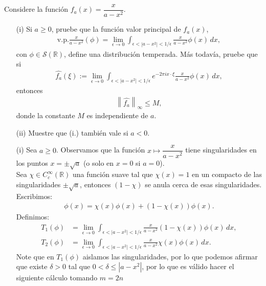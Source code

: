 \begin{homeworkProblem}
  Considere la función $f_a(x) = \dfrac{x}{a - x^2}$.
  \begin{itemize}
    \item[(i)] Si $a \geq 0$, pruebe que la función valor principal de $f_a(x)$,
    \begin{align*}
      \text{v.p.} \frac{x}{a - x^2} (\phi)= \lim_{\epsilon \to 0} \int_{\epsilon < |a - x^2| < 1/\epsilon} \frac{x}{a - x^2} \phi(x) \, dx,
    \end{align*}
    con $\phi \in \mathcal{S}(\mathbb{R})$, define una distribución temperada. Más todavía, pruebe que si
    \begin{align*}
      \hat{f_a}(\xi) := \lim_{\epsilon \to 0} \int_{\epsilon < |a - x^2| < 1/\epsilon} e^{-2\pi i x \cdot \xi} \frac{x}{a - x^2} \phi(x) \, dx,
    \end{align*}
    entonces
    \begin{align*}
      \left\| \hat{f_a} \right\|_{\infty} \leq M,
    \end{align*}
    donde la constante $M$ es independiente de $a$.  
    \item[(ii)] Muestre que (i.) también vale si $a < 0$.
  \end{itemize}
  \begin{solution}
    \begin{itemize}
      \item[(i)] Sea $a \geq 0$. Observamos que la funci\'on $x \mapsto \dfrac{x}{a - x^2}$ tiene singularidades en los puntos $x = \pm \sqrt{a}$ (o solo en $x=0$ si $a=0$).\\
       Sea $\chi \in C_c^{\infty}(\mathbb{R})$ una función suave tal que $\chi(x) = 1$ en un compacto de las singularidades $\pm\sqrt{a}$, entonces $(1 - \chi)$ se anula cerca de esas singularidades. Escribimos:
        \begin{align*}
          \phi(x) = \chi(x)\phi(x) + (1 - \chi(x))\phi(x).
        \end{align*}
        Definimos:
        \begin{align*}
          T_1(\phi) &= \lim_{\epsilon \to 0} \int_{\epsilon < |a - x^2| < 1/\epsilon} \frac{x}{a - x^2} (1 - \chi(x))\phi(x) \, dx, \\
          T_2(\phi) &= \lim_{\epsilon \to 0} \int_{\epsilon < |a - x^2| < 1/\epsilon} \frac{x}{a - x^2} \chi(x)\phi(x) \, dx.
        \end{align*}
        Note que en $T_1(\phi)$ aislamos las singularidades, por lo que podemos afirmar que existe $\delta>0$ tal que $0<\delta\leq |a-x^2|$, por lo que es válido hacer el siguiente cálculo tomando $m=2n$

\end{itemize}
\end{solution}
\end{homeworkProblem}

